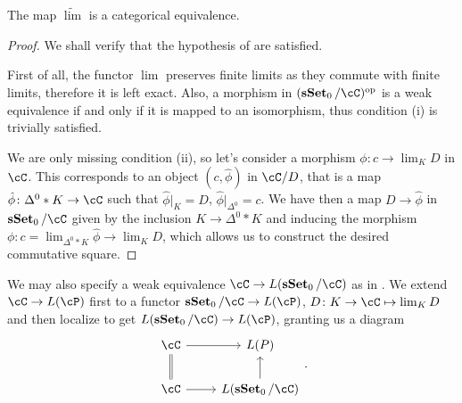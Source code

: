 \documentclass[a4paper,12pt]{scrartcl}
\begin{document}

\begin{prop}
  The map $\widetilde{\lim}$ is a categorical equivalence.
\end{prop}
\begin{proof}
  We shall verify that the hypothesis of \cite[Prop.\ 7.6.15]{Cis19} are
  satisfied.

  First of all, the functor $\lim$ preserves finite limits as they commute with
  finite limits, therefore it is left exact. Also, a morphism in
  $(\sSet_0/\cC)^{\op}$ is a weak equivalence if and only if it is mapped to an
  isomorphism, thus condition (i) is trivially satisfied.

  We are only missing condition (ii), so let's consider a morphism
  $\phi\colon c\rightarrow\lim_K D$ in $\cC$. This corresponds to an object
  $(c,\hat{\phi})$ in $\cC/D$, that is a map
  $\hat{\phi}\colon\Delta^0*K\rightarrow\cC$ such that $\hat{\phi}|_K=D$,
  $\hat{\phi}|_{\Delta^0}=c$. We have then a map $D\rightarrow\hat{\phi}$ in
  $\sSet_0/\cC$ given
  by the inclusion $K\rightarrow\Delta^0*K$ and inducing the morphism
  $\phi\colon c=\lim_{\Delta^0*K}\hat{\phi}\rightarrow\lim_KD$, which allows us
  to construct the desired commutative square.
\end{proof}

We may also specify a weak equivalence $\cC\rightarrow L(\sSet_0/\cC)$ as in
\cite[Def.\ 4.6]{Szu17b} .
We extend $\cC\rightarrow L(\cP)$ first to a functor $\sSet_0/\cC\rightarrow
L(\cP)$, $D\colon K\rightarrow\cC\mapsto\lim_KD$  and then localize to get $L(\sSet_0/\cC)\rightarrow L(\cP)$, granting us a
diagram
\[\begin{tikzcd}
	\cC & {L(P)} \\
	\cC & {L(\sSet_0/\cC)}
	\arrow[from=2-2, to=1-2]
	\arrow[from=1-1, to=1-2]
	\arrow[Rightarrow, no head, from=2-1, to=1-1]
	\arrow[from=2-1, to=2-2]
\end{tikzcd}.\]
\end{document}
